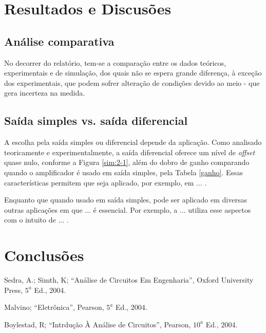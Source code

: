 \documentclass[a4paper,12pt,oneside,openany,table,xcdraw]{article}
\begin{document}
\section{Resultados e Discusões} 

\subsection{Análise comparativa}
No decorrer do relatório, tem-se a comparação entre os dados teóricos, experimentais e de simulação, dos quais não se espera grande diferença, à exceção dos experimentais, que podem sofrer alteração de condições devido ao meio - que gera incerteza na medida.

\subsection{Saída simples vs. saída diferencial}
A escolha pela saída simples ou diferencial depende da aplicação. Como analisado teoricamente e experimentalmente, a saída diferencial oferece um nível de \emph{offset} quase nulo, conforme a Figura \ref{sim:2-1}, além do dobro de ganho comparando quando o amplificador é usado em saída simples, pela Tabela \ref{ganho}. Essas características permitem que seja aplicado, por exemplo, em ... .

Enquanto que quando usado em saída simples, pode ser aplicado em diversas outras aplicações em que ... é essencial. Por exemplo, a ... utiliza esse aspectos com o intuito de ... . 

\section{Conclusões} 

\newpage
\begin{thebibliography}{9} 
    Sedra, A.; Simth, K; 
    “Análise de Circuitos Em Engenharia”, Oxford University Press, $5^a$ Ed., 2004.

    Malvino; 
    “Eletrônica”, Pearson, $5^a$ Ed., 2004.

    Boylestad, R;
    “Intrdução À Análise de Circuitos”, Pearson, $10^a$ Ed., 2004.

\end{thebibliography}
\end{document}
